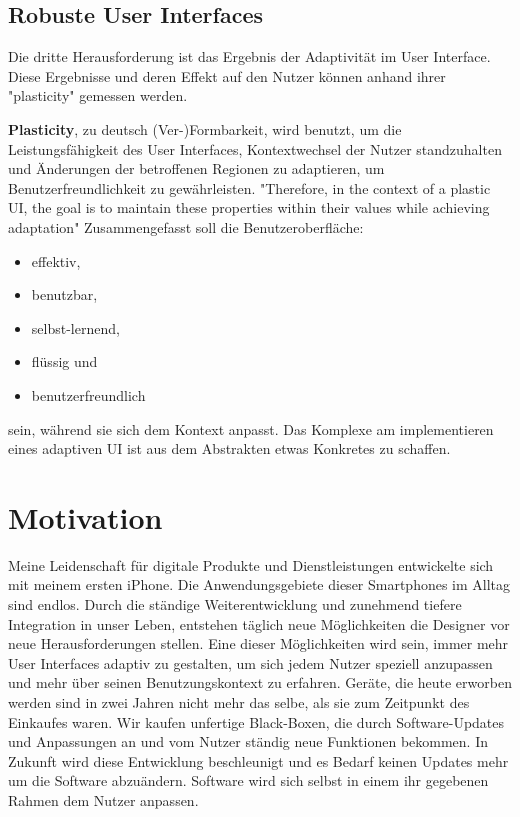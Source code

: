 \subsection{Robuste User Interfaces} %
Die dritte Herausforderung ist das Ergebnis der Adaptivität im User Interface. Diese Ergebnisse und deren Effekt auf den Nutzer
können anhand ihrer "plasticity" gemessen werden.

\textbf{Plasticity}, zu deutsch (Ver-)Formbarkeit, wird benutzt, um die Leistungsfähigkeit des User Interfaces,
Kontextwechsel der Nutzer standzuhalten und Änderungen der betroffenen Regionen zu adaptieren,
um Benutzerfreundlichkeit zu gewährleisten.
"Therefore, in the context of a plastic UI, the goal is to maintain these properties within their values while achieving adaptation"
Zusammengefasst soll die Benutzeroberfläche:
\begin{itemize}
    \item effektiv,
    \item benutzbar,
    \item selbst-lernend,
    \item flüssig und
    \item benutzerfreundlich
\end{itemize}
sein, während sie sich dem Kontext anpasst. Das Komplexe am implementieren eines adaptiven UI ist aus dem Abstrakten
etwas Konkretes zu schaffen.

\section{Motivation}
Meine Leidenschaft für digitale Produkte und Dienstleistungen entwickelte sich mit meinem ersten iPhone.
Die Anwendungsgebiete dieser Smartphones im Alltag sind endlos. Durch die ständige Weiterentwicklung
und zunehmend tiefere Integration in unser Leben, entstehen täglich neue Möglichkeiten die Designer vor
neue Herausforderungen stellen. Eine dieser Möglichkeiten wird sein, immer mehr User Interfaces adaptiv zu gestalten,
um sich jedem Nutzer speziell anzupassen und mehr über seinen Benutzungskontext zu erfahren. Geräte, die
heute erworben werden sind in zwei Jahren nicht mehr das selbe, als sie zum Zeitpunkt des Einkaufes waren.
Wir kaufen unfertige Black-Boxen,
die durch Software-Updates und Anpassungen an und vom Nutzer ständig neue Funktionen bekommen. %
In Zukunft wird diese Entwicklung beschleunigt und es Bedarf keinen Updates mehr um die Software abzuändern.
Software wird sich selbst in einem ihr gegebenen Rahmen dem Nutzer anpassen.

